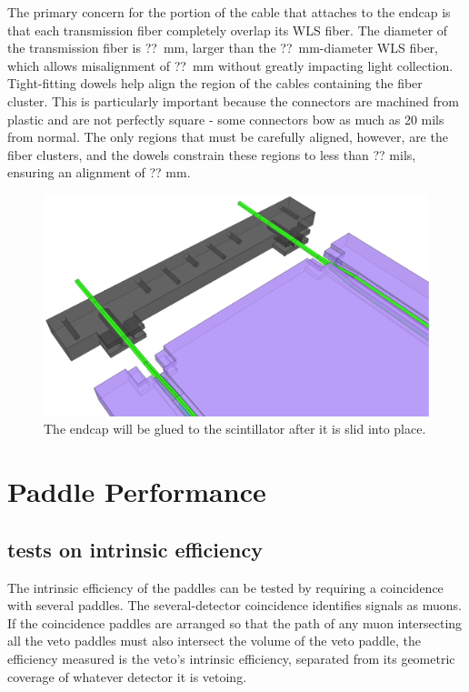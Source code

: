 The primary concern for the portion of the cable that attaches to the endcap is that each transmission fiber completely overlap its WLS fiber.  The diameter of the transmission fiber is ??~mm, larger than the ??~mm-diameter WLS fiber, which allows misalignment of ??~mm without greatly impacting light collection.  Tight-fitting dowels help align the region of the cables containing the fiber cluster.  This is particularly important because the connectors are machined from plastic and are not perfectly square - some connectors bow as much as 20 mils from normal.  The only regions that must be carefully aligned, however, are the fiber clusters, and the dowels constrain these regions to less than ?? mils, ensuring an alignment of ?? mm.

\begin{figure}[htp]
\centering
\includegraphics[width=1.0\textwidth]{figures/veto_assembly.eps}
\caption{The endcap will be glued to the scintillator after it is slid into place.}
\label{fig:paddleAssembly}
\end{figure}


\section{Paddle Performance}
\subsection{tests on intrinsic efficiency}

The intrinsic efficiency of the paddles can be tested by requiring a coincidence with several paddles.  The several-detector coincidence identifies signals as muons.  If the coincidence paddles are arranged so that the path of any muon intersecting all the veto paddles must also intersect the volume of the veto paddle, the efficiency measured is the veto's intrinsic efficiency, separated from its geometric coverage of whatever detector it is vetoing.

